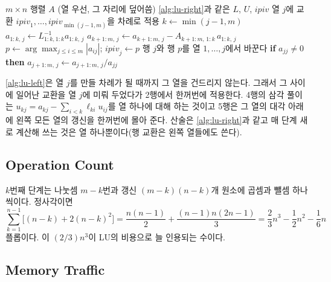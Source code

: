 \begin{algorithm}[htbp]
\begin{algorithmic}[1]
\Require $m\times n$ 행렬 $A$ (열 우선, 그 자리에 덮어씀)
\Ensure \cref{alg:lu-right}과 같은 $L$, $U$, $\mathit{ipiv}$
  \State 열 $j$에 교환 $\mathit{ipiv}_1,\dots,\mathit{ipiv}_{\min(j-1,m)}$을 차례로 적용 
  \State $k\gets\min(j-1,m)$
  \State $a_{1:k,\,j}\gets L_{1:k,1:k}^{-1}a_{1:k,\,j}$ 
  \State $a_{k+1:m,\,j}\gets a_{k+1:m,\,j}-A_{k+1:m,\,1:k}\,a_{1:k,\,j}$ 
    \State $p\gets\arg\max_{j\le i\le m}|a_{ij}|$; $\mathit{ipiv}_j\gets p$
    \State 행 $j$와 행 $p$를 열 $1,\dots,j$에서 바꾼다 
    \State \textbf{if} $a_{jj}\ne0$ \textbf{then} $a_{j+1:m,\,j}\gets a_{j+1:m,\,j}/a_{jj}$
  \EndIf
\EndFor
\end{algorithmic}
\caption{부분 피벗을 쓰는 왼쪽 보기 LU ($jki$ 꼴)}
\label{alg:lu-left}
\end{algorithm}

\cref{alg:lu-left}은 열 $j$를 만들 차례가 될 때까지 그 열을 건드리지 않는다. 그래서 그 사이에 일어난 교환을 열 $j$에 미뤄 두었다가 2행에서 한꺼번에 적용한다. 4행의 삼각 풀이는 $u_{kj}=a_{kj}-\sum_{i<k}\ell_{ki}u_{ij}$를 열 하나에 대해 하는 것이고 5행은 그 열의 대각 아래에 왼쪽 모든 열의 갱신을 한꺼번에 몰아 준다. 산술은 \cref{alg:lu-right}과 같고 매 단계 새로 계산해 쓰는 것은 열 하나뿐이다(행 교환은 왼쪽 열들에도 쓴다).

\subsection{Operation Count}

$k$번째 단계는 나눗셈 $m-k$번과 갱신 $(m-k)(n-k)$개 원소에 곱셈과 뺄셈 하나씩이다. 정사각이면
\[
\sum_{k=1}^{n-1}\bigl[(n-k)+2(n-k)^2\bigr]=\frac{n(n-1)}2+\frac{(n-1)n(2n-1)}3=\frac23n^3-\frac12n^2-\frac16n
\]
플롭이다. 이 $(2/3)n^3$이 LU의 비용으로 늘 인용되는 수이다.

\subsection{Memory Traffic}

